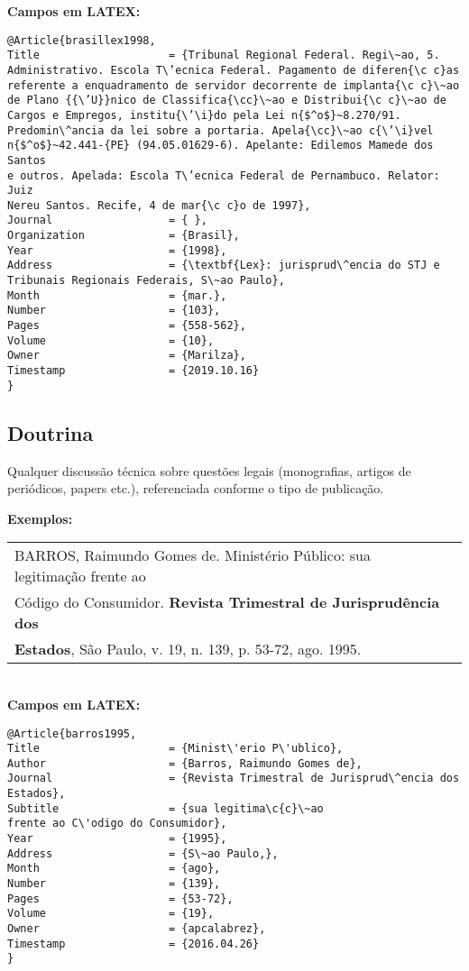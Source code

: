 \textbf{Campos em LATEX:} 

\begin{verbatim}
@Article{brasillex1998,
Title                    = {Tribunal Regional Federal. Regi\~ao, 5. 
Administrativo. Escola T\’ecnica Federal. Pagamento de diferen{\c c}as 
referente a enquadramento de servidor decorrente de implanta{\c c}\~ao 
de Plano {{\’U}}nico de Classifica{\cc}\~ao e Distribui{\c c}\~ao de 
Cargos e Empregos, institu{\’\i}do pela Lei n{$^o$}~8.270/91. 
Predomin\^ancia da lei sobre a portaria. Apela{\cc}\~ao c{\’\i}vel
n{$^o$}~42.441-{PE} (94.05.01629-6). Apelante: Edilemos Mamede dos Santos
e outros. Apelada: Escola T\’ecnica Federal de Pernambuco. Relator: Juiz
Nereu Santos. Recife, 4 de mar{\c c}o de 1997},
Journal                  = { },
Organization             = {Brasil},
Year                     = {1998},
Address                  = {\textbf{Lex}: jurisprud\^encia do STJ e 
Tribunais Regionais Federais, S\~ao Paulo},
Month                    = {mar.},
Number                   = {103},
Pages                    = {558-562},
Volume                   = {10},
Owner                    = {Marilza},
Timestamp                = {2019.10.16}
}
\end{verbatim}

\subsection{Doutrina}

Qualquer discuss\~ao t\'ecnica sobre quest\~oes legais (monografias, artigos
de peri\'odicos, papers etc.), referenciada conforme o tipo de publica\c{c}\~ao. 

\textbf{Exemplos:} \\

\begin{tabular}{|l|c|} \hline
	BARROS, Raimundo Gomes de. Minist\'erio P\'ublico: sua legitima\c{c}\~ao	frente ao\\
	C\'odigo do Consumidor. \textbf{Revista Trimestral de Jurisprud\^encia dos}\\
	\textbf{Estados}, S\~ao Paulo, v. 19, n. 139, p. 53-72, ago. 1995. \\\hline
\end{tabular} \\

\textbf{Campos em LATEX:} 

\begin{verbatim}
@Article{barros1995,
Title                    = {Minist\'erio P\'ublico},
Author                   = {Barros, Raimundo Gomes de},
Journal                  = {Revista Trimestral de Jurisprud\^encia dos 
Estados},
Subtitle                 = {sua legitima\c{c}\~ao
frente ao C\'odigo do Consumidor},
Year                     = {1995},
Address                  = {S\~ao Paulo,},
Month                    = {ago},
Number                   = {139},
Pages                    = {53-72},
Volume                   = {19},
Owner                    = {apcalabrez},
Timestamp                = {2016.04.26}
}
\end{verbatim}

